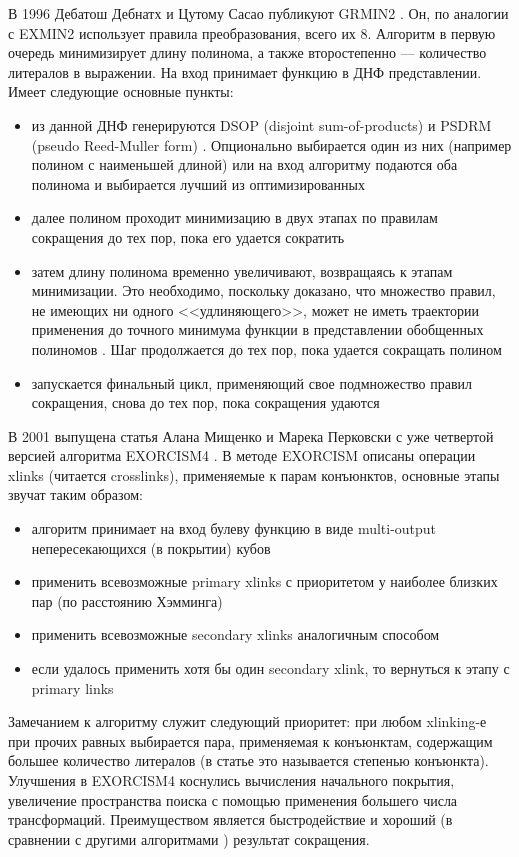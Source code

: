 \documentclass[a4paper,12pt,titlepage,finall]{article}
\begin{document}
В 1996 Дебатош Дебнатх и Цутому Сасао публикуют GRMIN2 \cite{grmin2}.
Он, по аналогии с \textsc{EXMIN2} использует правила преобразования, всего их 8. Алгоритм в первую очередь минимизирует длину полинома, а также второстепенно --- количество литералов в выражении. На вход принимает функцию в ДНФ представлении. Имеет следующие основные пункты:
\begin{itemize}
    \item из данной ДНФ генерируются DSOP (disjoint sum-of-products) \cite{exmin2} и PSDRM (pseudo Reed-Muller form) \cite{psdrm}. Опционально выбирается один из них (например полином с наименьшей длиной) или на вход алгоритму подаются оба полинома и выбирается лучший из оптимизированных
    \item далее полином проходит минимизацию в двух этапах по правилам сокращения до тех пор, пока его удается сократить
    \item затем длину полинома временно увеличивают, возвращаясь к этапам минимизации. Это необходимо, поскольку доказано, что множество правил, не имеющих ни одного <<удлиняющего>>, может не иметь траектории применения до точного минимума функции в представлении обобщенных полиномов \cite{convergence}. Шаг продолжается до тех пор, пока удается сокращать полином
    \item запускается финальный цикл, применяющий свое подмножество правил сокращения, снова до тех пор, пока сокращения удаются
\end{itemize}

В 2001 выпущена статья Алана Мищенко и Марека Перковски с уже четвертой версией алгоритма \textsc{EXORCISM4} \cite{exorcism4}. В методе \textsc{EXORCISM} описаны операции xlinks (читается crosslinks), применяемые к парам конъюнктов, основные этапы звучат таким образом:
\begin{itemize}
    \item алгоритм принимает на вход булеву функцию в виде multi-output непересекающихся (в покрытии) кубов
    \item применить всевозможные primary xlinks с приоритетом у наиболее близких пар (по расстоянию Хэмминга)
    \item применить всевозможные secondary xlinks аналогичным способом
    \item если удалось применить хотя бы один secondary xlink, то вернуться к этапу с primary links
\end{itemize}
Замечанием к алгоритму служит следующий приоритет: при любом xlinking-е при прочих равных выбирается пара, применяемая к конъюнктам, содержащим большее количество литералов (в статье это называется степенью конъюнкта). Улучшения в \textsc{EXORCISM4} коснулись вычисления начального покрытия, увеличение пространства поиска с помощью применения большего числа трансформаций. Преимуществом является быстродействие и хороший (в сравнении с другими алгоритмами \cite{exmin2} \cite{mint}) результат сокращения.
\end{document}
